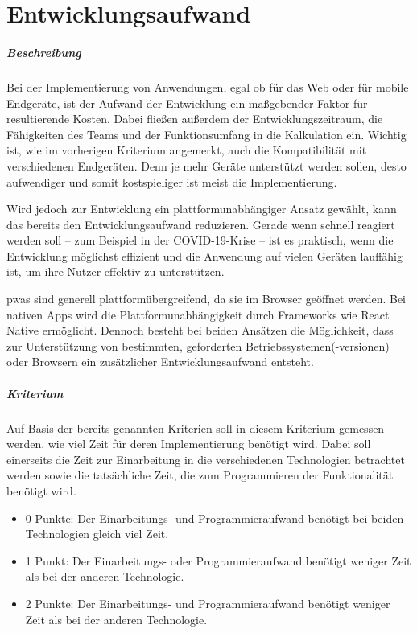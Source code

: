 \section{Entwicklungsaufwand}
\subparagraph{Beschreibung\\}
Bei der Implementierung von Anwendungen, egal ob für das Web oder für mobile Endgeräte, ist der Aufwand der Entwicklung ein maßgebender Faktor für resultierende Kosten.
Dabei fließen außerdem der Entwicklungszeitraum, die Fähigkeiten des Teams und der Funktionsumfang in die Kalkulation ein.
Wichtig ist, wie im vorherigen Kriterium angemerkt, auch die Kompatibilität mit verschiedenen Endgeräten.
Denn je mehr Geräte unterstützt werden sollen, desto aufwendiger und somit kostspieliger ist meist die Implementierung.

Wird jedoch zur Entwicklung ein plattformunabhängiger Ansatz gewählt, kann das bereits den Entwicklungsaufwand reduzieren.
Gerade wenn schnell reagiert werden soll -- zum Beispiel in der COVID-19-Krise -- ist es praktisch, wenn die Entwicklung möglichst effizient und die Anwendung auf vielen Geräten lauffähig ist, um ihre Nutzer effektiv zu unterstützen.

\acp{pwa} sind generell plattformübergreifend, da sie im Browser geöffnet werden.
Bei nativen Apps wird die Plattformunabhängigkeit durch Frameworks wie React Native ermöglicht.
Dennoch besteht bei beiden Ansätzen die Möglichkeit, dass zur Unterstützung von bestimmten, geforderten Betriebssystemen(-versionen) oder Browsern ein zusätzlicher Entwicklungsaufwand entsteht.

\subparagraph{Kriterium\\}
Auf Basis der bereits genannten Kriterien soll in diesem Kriterium gemessen werden, wie viel Zeit für deren Implementierung benötigt wird.
Dabei soll einerseits die Zeit zur Einarbeitung in die verschiedenen Technologien betrachtet werden sowie die tatsächliche Zeit, die zum Programmieren der Funktionalität benötigt wird.

\begin{itemize}
\item 0 Punkte: Der Einarbeitungs- und Programmieraufwand benötigt bei beiden Technologien gleich viel Zeit.
\item 1 Punkt: Der Einarbeitungs- oder Programmieraufwand benötigt weniger Zeit als bei der anderen Technologie.
\item 2 Punkte: Der Einarbeitungs- und Programmieraufwand benötigt weniger Zeit als bei der anderen Technologie.
\end{itemize}